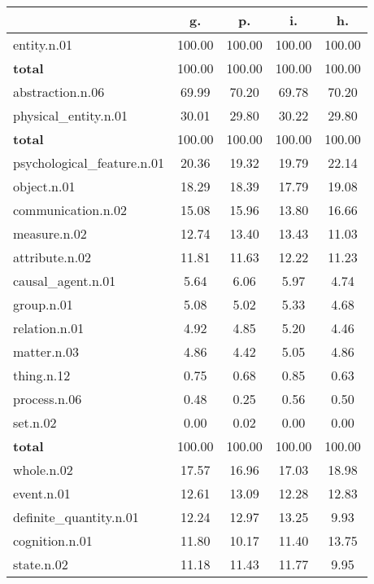 \begin{table}[h!]
\begin{center}
\begin{tabular}{| l || c | c | c | c |}\hline
 & {\bf g.} & {\bf p.} & {\bf i.} & {\bf h.} \\\hline\hline
entity.n.01 & 100.00  & 100.00  & 100.00  & 100.00 \\\hline\hline
{{\bf total}} & 100.00  & 100.00  & 100.00  & 100.00 \\\hline\hline\hline
abstraction.n.06 & 69.99  & 70.20  & 69.78  & 70.20 \\\hline
physical\_entity.n.01 & 30.01  & 29.80  & 30.22  & 29.80 \\\hline\hline
{{\bf total}} & 100.00  & 100.00  & 100.00  & 100.00 \\\hline\hline\hline
psychological\_feature.n.01 & 20.36  & 19.32  & 19.79  & 22.14 \\\hline
object.n.01 & 18.29  & 18.39  & 17.79  & 19.08 \\\hline
communication.n.02 & 15.08  & 15.96  & 13.80  & 16.66 \\\hline
measure.n.02 & 12.74  & 13.40  & 13.43  & 11.03 \\\hline
attribute.n.02 & 11.81  & 11.63  & 12.22  & 11.23 \\\hline
causal\_agent.n.01 & 5.64  & 6.06  & 5.97  & 4.74 \\\hline
group.n.01 & 5.08  & 5.02  & 5.33  & 4.68 \\\hline
relation.n.01 & 4.92  & 4.85  & 5.20  & 4.46 \\\hline
matter.n.03 & 4.86  & 4.42  & 5.05  & 4.86 \\\hline
thing.n.12 & 0.75  & 0.68  & 0.85  & 0.63 \\\hline
process.n.06 & 0.48  & 0.25  & 0.56  & 0.50 \\\hline
set.n.02 & 0.00  & 0.02  & 0.00  & 0.00 \\\hline\hline
{{\bf total}} & 100.00  & 100.00  & 100.00  & 100.00 \\\hline\hline\hline
whole.n.02 & 17.57  & 16.96  & 17.03  & 18.98 \\\hline
event.n.01 & 12.61  & 13.09  & 12.28  & 12.83 \\\hline
definite\_quantity.n.01 & 12.24  & 12.97  & 13.25  & 9.93 \\\hline
cognition.n.01 & 11.80  & 10.17  & 11.40  & 13.75 \\\hline
state.n.02 & 11.18  & 11.43  & 11.77  & 9.95 \\\hline

\end{tabular}
\end{center}
\end{table}
